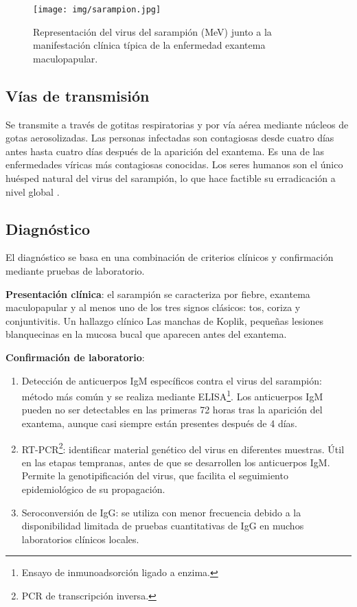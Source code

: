 \begin{figure}[H]
        \centering
        \texttt{[image: img/sarampion.jpg]}
        \caption{Representación del virus del sarampión (MeV) junto a la manifestación clínica típica de la enfermedad exantema maculopapular.}
        \label{fig:sarampión}
        \vspace{0.5cm} %
\end{figure}

\subsection{Vías de transmisión}
Se transmite a través de gotitas respiratorias y por vía aérea mediante núcleos de gotas aerosolizadas. Las personas infectadas son contagiosas desde cuatro días antes hasta cuatro días después de la aparición del exantema. Es una de las enfermedades víricas más contagiosas conocidas. Los seres humanos son el único huésped natural del virus del sarampión, lo que hace factible su erradicación a nivel global \cite{moss2017measles}.

\subsection{Diagnóstico}
El diagnóstico se basa \cite{baeten2012antiretroviral} en una combinación de criterios clínicos y confirmación mediante pruebas de laboratorio.

\textbf{Presentación clínica}: el sarampión se caracteriza por fiebre, exantema maculopapular y al menos uno de los tres signos clásicos: tos, coriza y conjuntivitis. Un hallazgo clínico Las manchas de Koplik, pequeñas lesiones blanquecinas en la mucosa bucal que aparecen antes del exantema.

\textbf{Confirmación de laboratorio}:
\begin{enumerate}
    \item Detección de anticuerpos IgM específicos contra el virus del sarampión: método más común y se realiza mediante ELISA\footnote{Ensayo de inmunoadsorción ligado a enzima.}. Los anticuerpos IgM pueden no ser detectables en las primeras 72 horas tras la aparición del exantema, aunque casi siempre están presentes después de 4 días.
    \item RT-PCR\footnote{PCR de transcripción inversa.}: identificar material genético del virus en diferentes muestras. Útil en las etapas tempranas, antes de que se desarrollen los anticuerpos IgM. Permite la genotipificación del virus, que facilita el seguimiento epidemiológico de su propagación.
    \item Seroconversión de IgG:  se utiliza con menor frecuencia debido a la disponibilidad limitada de pruebas cuantitativas de IgG en muchos laboratorios clínicos locales.
\end{enumerate}

